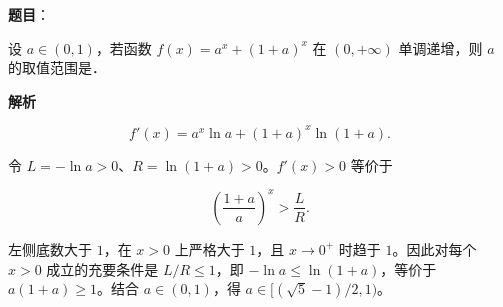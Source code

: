 \begin{answer}

\textbf{题目}：

设 $a\in(0,1)$，若函数 $f(x)=a^x+(1+a)^x$ 在 $(0,+\infty)$ 单调递增，则 $a$ 的取值范围是\gkblank{}．

\textbf{解析}

\nopagebreak[4]
\[
f'(x)=a^x\ln a+(1+a)^x\ln(1+a).
\]

令 $L=-\ln a>0$、$R=\ln(1+a)>0$。$f'(x)>0$ 等价于

\nopagebreak[4]
\[
\left(\frac{1+a}{a}\right)^x>\frac LR.
\]

左侧底数大于 $1$，在 $x>0$ 上严格大于 $1$，且 $x\to0^+$ 时趋于 $1$。因此对每个 $x>0$ 成立的充要条件是 $L/R\leqslant1$，即 $-\ln a\leqslant\ln(1+a)$，等价于 $a(1+a)\geqslant1$。结合 $a\in(0,1)$，得 $a\in[(\sqrt5-1)/2,1)$。

\gkanswer{答案：$\left[\dfrac{\sqrt5-1}{2},1\right)$}

\par\medskip

\end{answer}

